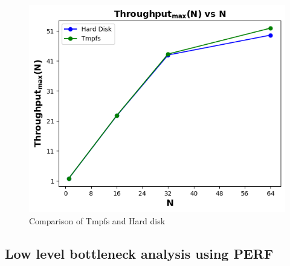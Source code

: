 \documentclass[sigconf]{acmart}
\begin{document}
\begin{figure}[!htb]
  \centering
  \includegraphics[width=\linewidth]{Pictures/hard_disk_tmpfs_comparision.png}
  \caption{ Comparison of Tmpfs and Hard disk}
  \label{evalpro_micro_benchmark_tmpfs_comparision}
\end{figure}

\subsection{Low level bottleneck analysis using PERF}
\end{document}
